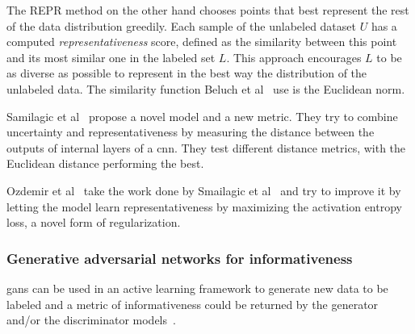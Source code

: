     The REPR method on the other hand chooses points that best represent the rest of the data distribution greedily.
    Each sample of the unlabeled dataset $U$ has a computed \emph{representativeness} score, defined as the similarity between this point and its most similar one in the labeled set $L$. 
    This approach encourages $L$ to be as diverse as possible to represent in the best way the distribution of the unlabeled data. The similarity function Beluch et al~\cite{beluch2018power} use is the Euclidean norm.
    
    
    Samilagic et al~\cite{smailagic2018medal} propose a novel model and a new metric. They try to combine uncertainty and representativeness by measuring the distance between the outputs of internal layers of a \acrshort{cnn}. They test different distance metrics, with the Euclidean distance performing the best.
    
    
    
    Ozdemir et al~\cite{ozdemir2018active} take the work done by Smailagic et al~\cite{smailagic2018medal} and try to improve it by letting the model learn representativeness by maximizing the activation entropy loss, a novel form of regularization.
    
    
    \subsubsection*{Generative adversarial networks for informativeness}
    \acrshort{gan}s can be used in an active learning framework to generate new data to be labeled and a metric of informativeness could be returned by the generator and/or the discriminator models~\cite{ravanbakhsh2020human, mahapatra2018efficient, budd2021survey}.
    
